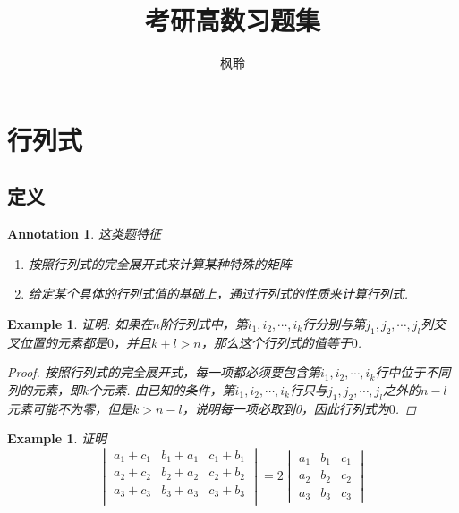 \documentclass{article}
\newtheorem{example}[theorem]{Example}
\newtheorem{annotation}[theorem]{Annotation}
\begin{document}
\title{考研高数习题集}
\author{枫聆}
\maketitle
\tableofcontents

\newpage
\section{行列式}

\subsection{定义}

\begin{annotation}
\rm 这类题特征
\begin{enumerate}
	\item 按照行列式的完全展开式来计算某种特殊的矩阵
	\item 给定某个具体的行列式值的基础上，通过行列式的性质来计算行列式. 
\end{enumerate}
\end{annotation}

\begin{example}
\rm 证明: 如果在$n$阶行列式中，第$i_1,i_2,\cdots,i_k$行分别与第$j_1,j_2,\cdots,j_l$列交叉位置的元素都是$0$，并且$k+l > n$，那么这个行列式的值等于$0$.
\begin{proof}
按照行列式的完全展开式，每一项都必须要包含第$i_1,i_2,\cdots,i_k$行中位于不同列的元素，即$k$个元素. 由已知的条件，第$i_1,i_2,\cdots,i_k$行只与$j_1,j_2,\cdots,j_l$之外的$n-l$元素可能不为零，但是$k > n-l$，说明每一项必取到0，因此行列式为$0$. 
\end{proof}
\end{example}

\begin{example}
\rm 证明
$$
\begin{vmatrix}
a_1 + c_1 &  b_1 + a_1 & c_1+b_1 \\
a_2 + c_2 &  b_2 + a_2 & c_2+b_2 \\
a_3 + c_3 &  b_3 + a_3 & c_3+b_3 \\
\end{vmatrix} = 2 \begin{vmatrix}
a_1 & b_1 & c_1 \\
a_2 & b_2 & c_2 \\
a_3 & b_3 & c_3 	
\end{vmatrix}
$$
\end{example}
\end{document}
